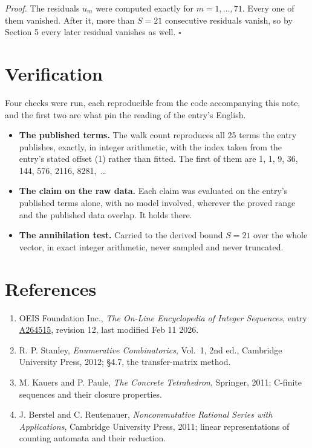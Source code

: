 \documentclass[11pt]{article}
\theoremstyle{definition}
\begin{document}
{\itshape Proof.} The residuals $u_m$ were computed exactly for $m = 1,\dots,71$. Every one of them vanished. After it, more than $S = 21$ consecutive residuals vanish, so by Section 5 every later residual vanishes as well. $\square$

\section{Verification}

Four checks were run, each reproducible from the code accompanying this note, and the first two are what pin the reading of the entry's English.

\begin{itemize}

\item {\bfseries The published terms.} The walk count reproduces all 25 terms the entry publishes, exactly, in integer arithmetic, with the index taken from the entry's stated offset (1) rather than fitted. The first of them are 1, 1, 9, 36, 144, 576, 2116, 8281,~\dots

\item {\bfseries The claim on the raw data.} Each claim was evaluated on the entry's published terms alone, with no model involved, wherever the proved range and the published data overlap. It holds there.

\item {\bfseries The annihilation test.} Carried to the derived bound $S = 21$ over the whole vector, in exact integer arithmetic, never sampled and never truncated.

\end{itemize}

\section{References}

\begin{enumerate}

\item OEIS Foundation Inc., \emph{The On-Line Encyclopedia of Integer Sequences}, entry \href{https://oeis.org/A264515}{A264515}, revision 12, last modified Feb 11 2026.

\item R. P. Stanley, \emph{Enumerative Combinatorics}, Vol.~1, 2nd ed., Cambridge University Press, 2012; \S4.7, the transfer-matrix method.

\item M. Kauers and P. Paule, \emph{The Concrete Tetrahedron}, Springer, 2011; C-finite sequences and their closure properties.

\item J. Berstel and C. Reutenauer, \emph{Noncommutative Rational Series with Applications}, Cambridge University Press, 2011; linear representations of counting automata and their reduction.

\end{enumerate}
\end{document}
